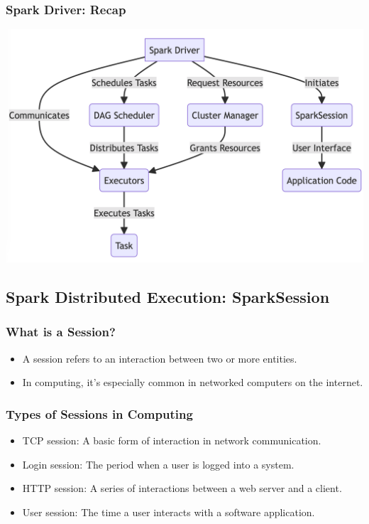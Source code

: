 \begin{frame}
    \frametitle{Spark Driver: Recap}
%
    \includegraphics[width=\textwidth,height=.85\textheight,keepaspectratio]{./Figures/chapter-04/Mairmaid_SparkDriver}

\end{frame}


\subsection{Spark Distributed Execution: SparkSession}\label{subsec:spark-session}
\begin{frame}
    \frametitle{What is a Session?}

    \begin{itemize}
        \item A session refers to an interaction between two or more entities.
        \item In computing, it's especially common in networked computers on the internet.
    \end{itemize}

\end{frame}

\begin{frame}
    \frametitle{Types of Sessions in Computing}

    \begin{itemize}
        \item TCP session: A basic form of interaction in network communication.
        \item Login session: The period when a user is logged into a system.
        \item HTTP session: A series of interactions between a web server and a client.
        \item User session: The time a user interacts with a software application.
    \end{itemize}

\end{frame}


